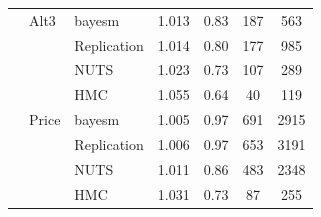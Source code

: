 \begin{longtable}{cllcccc}
 & Alt3 & bayesm & 1.013 & 0.83 & 187 & 563 \\
 &  & Replication & 1.014 & 0.80 & 177 & 985 \\
 &  & NUTS & 1.023 & 0.73 & 107 & 289 \\
 &  & HMC & 1.055 & 0.64 & 40 & 119 \\
 & Price & bayesm & 1.005 & 0.97 & 691 & 2915 \\
 &  & Replication & 1.006 & 0.97 & 653 & 3191 \\
 &  & NUTS & 1.011 & 0.86 & 483 & 2348 \\
 &  & HMC & 1.031 & 0.73 & 87 & 255 \\
\end{longtable}
